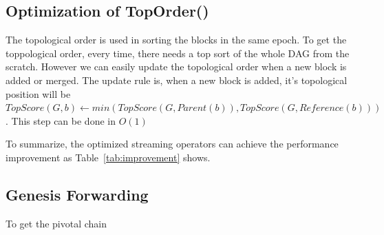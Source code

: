 \subsection{Optimization of TopOrder()}
The topological order is used in sorting the blocks in the same epoch.
To get the toppological order, every time, there needs a top sort of the whole DAG from the scratch.
However we can easily update the topological order when a new block is added or merged.
 The update rule is, when a new block is added, it's topological position will be $TopScore(G, b) \gets min(TopScore(G, Parent(b)), TopScore(G, Reference(b)))$. This step can be done in $O(1)$ 


To summarize, the optimized streaming operators can achieve the performance improvement as Table~\ref{tab:improvement} shows. 

\begin{table}[]
\caption {Analysis of Graph properties calculation} \label{tab:improvement}
\begin{center}
\end{center}
\end{table}



\subsection{Genesis Forwarding}
To get the pivotal chain
